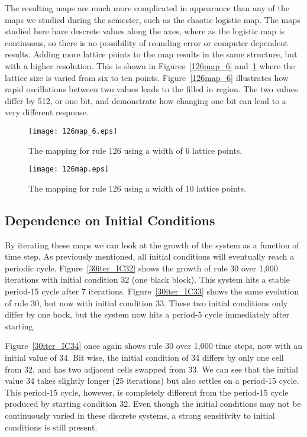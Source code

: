 The resulting maps are much more complicated in appearance than any of the maps we studied during the semester, such as the chaotic logistic map.  
The maps studied here have descrete values along the axes, where as the logistic map is continuous, so there is no possibility of rounding error or computer dependent results.  
Adding more lattice points to the map results in the same structure, but with a higher resolution.  
This is shown in Figures~\ref{126map_6} and~\ref{126map} where the lattice size is varied from six to ten points.  
Figure~\ref{126map_6} illustrates how rapid oscillations between two values leads to the filled in region.  
The two values differ by 512, or one bit, and demonstrate how changing one bit can lead to a very different response.   

\begin{figure}
    \begin{minipage}[b]{0.49\textwidth}
        \centering
        \texttt{[image: 126map\_6.eps]}
        \caption{\label{126map_6} The mapping for rule 126 using a width of 6 lattice points.  }
    \end{minipage}
    \hspace{0.5cm}
    \begin{minipage}[b]{0.49\textwidth}
        \centering
        \texttt{[image: 126map.eps]}
        \caption{\label{126map} The mapping for rule 126 using a width of 10 lattice points.}
    \end{minipage}
\end{figure}

\subsection{Dependence on Initial Conditions}

By iterating these maps we can look at the growth of the system as a function of time step.  As previously mentioned, all initial conditions will eventually reach a periodic cycle.  Figure~\ref{30iter_IC32} shows the growth of rule 30 over 1,000 iterations with initial condition 32 (one black block).  This system hits a stable period-15 cycle after 7 iterations.  Figure~\ref{30iter_IC33} shows the same evolution of rule 30, but now with initial condition 33.  These two initial conditions only differ by one bock, but the system now hits a period-5 cycle immediately after starting.  

Figure~\ref{30iter_IC34} once again shows rule 30 over 1,000 time steps, now with an initial value of 34.  Bit wise, the initial condition of 34 differs by only one cell from 32, and has two adjacent cells swapped from 33.  We can see that the initial value 34 takes slightly longer (25 iterations) but also settles on a period-15 cycle.  This period-15 cycle, however, is completely different from the period-15 cycle produced by starting condition 32.  Even though the initial conditions may not be continuously varied in these discrete systems, a strong sensitivity to initial conditions is still present.  

